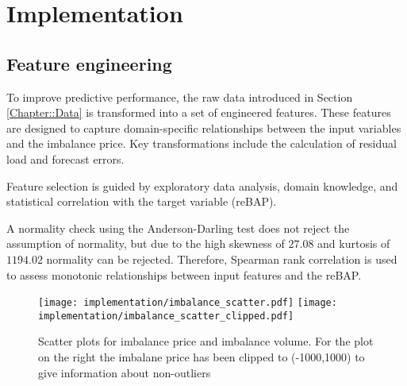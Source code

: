 \documentclass[class=scrbook, crop=false]{standalone}
\begin{document}
\chapter{Implementation} %
\label{Chapter::Implementation}

\section{Feature engineering}
\label{Section::Feature_engineering}
To improve predictive performance, the raw data introduced in Section \ref{Chapter::Data} is transformed into a set of engineered features. These features are designed to capture domain-specific relationships between the input variables and the imbalance price. Key transformations include the calculation of residual load and forecast errors.

Feature selection is guided by exploratory data analysis, domain knowledge, and statistical correlation with the target variable (\gls{reBAP}).


A normality check using the Anderson-Darling \cite{andersonAsymptoticTheoryCertain1952} test does not reject the assumption of normality, but due to the high skewness of $27.08$ and kurtosis of $1194.02$ normality can be rejected. Therefore, Spearman rank correlation is used to assess monotonic relationships between input features and the \gls{reBAP}.

\begin{figure}[H]
            \centering
            \texttt{[image: implementation/imbalance\_scatter.pdf]}
            \texttt{[image: implementation/imbalance\_scatter\_clipped.pdf]}
            \caption[Scatter plots for imbalance price and imbalance volume. For the plot on the right the imbalane price has been clipped to (-1000,1000) to give information about non-outliers]{Scatter plots for imbalance price and imbalance volume. For the plot on the right the imbalane price has been clipped to (-1000,1000) to give information about non-outliers}
            \label{Figure::volume_price_scatter}
\end{figure}

\end{document}
